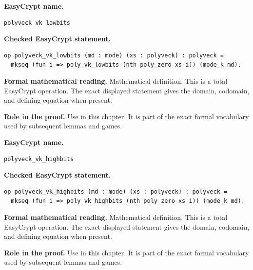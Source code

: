 \begin{formaldefinition}
\noindent\textbf{EasyCrypt name.}
\begin{lstlisting}[language=EasyCrypt,basicstyle=\ttfamily\scriptsize]
polyveck_vk_lowbits
\end{lstlisting}
\noindent\textbf{Checked EasyCrypt statement.}
\begin{lstlisting}[language=EasyCrypt,basicstyle=\ttfamily\scriptsize]
op polyveck_vk_lowbits (md : mode) (xs : polyveck) : polyveck =
  mkseq (fun i => poly_vk_lowbits (nth poly_zero xs i)) (mode_k md).
\end{lstlisting}
\noindent\textbf{Formal mathematical reading.}
Mathematical definition. This is a total EasyCrypt operation.  The exact displayed statement gives the domain, codomain, and defining equation when present.

\noindent\textbf{Role in the proof.}
Use in this chapter. It is part of the exact formal vocabulary used by subsequent lemmas and games.

\end{formaldefinition}

\begin{formaldefinition}
\noindent\textbf{EasyCrypt name.}
\begin{lstlisting}[language=EasyCrypt,basicstyle=\ttfamily\scriptsize]
polyveck_vk_highbits
\end{lstlisting}
\noindent\textbf{Checked EasyCrypt statement.}
\begin{lstlisting}[language=EasyCrypt,basicstyle=\ttfamily\scriptsize]
op polyveck_vk_highbits (md : mode) (xs : polyveck) : polyveck =
  mkseq (fun i => poly_vk_highbits (nth poly_zero xs i)) (mode_k md).
\end{lstlisting}
\noindent\textbf{Formal mathematical reading.}
Mathematical definition. This is a total EasyCrypt operation.  The exact displayed statement gives the domain, codomain, and defining equation when present.

\noindent\textbf{Role in the proof.}
Use in this chapter. It is part of the exact formal vocabulary used by subsequent lemmas and games.

\end{formaldefinition}

